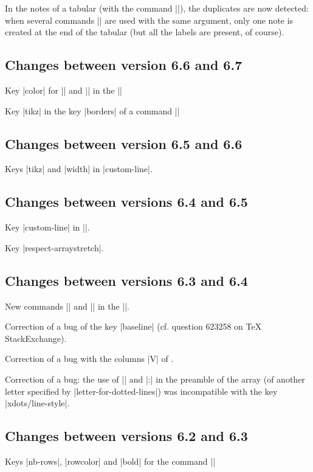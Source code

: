 \documentclass[dvipsnames]{article}%
\begin{document}
In the notes of a tabular (with the command |\tabularnote|), the duplicates
are now detected: when several commands |\tabularnote| are used with the same
argument, only one note is created at the end of the tabular (but all the
labels are present, of course).

\subsection*{Changes between version 6.6 and 6.7}

Key |color| for |\OverBrace| and |\UnderBrace| in the |\CodeAfter|

Key |tikz| in the key |borders| of a command |\Block|

\subsection*{Changes between version 6.5 and 6.6}

Keys |tikz| and |width| in |custom-line|.

\subsection*{Changes between versions 6.4 and 6.5}

Key |custom-line| in |\NiceMatrixOptions|.

Key |respect-arraystretch|.

\subsection*{Changes between versions 6.3 and 6.4}

New commands |\UnderBrace| and |\OverBrace| in the |\CodeAfter|.

Correction of a bug of the key |baseline| (cf. question 623258 on TeX StackExchange).

Correction of a bug with the columns |V| of .

Correction of a bug: the use of |\hdottedline| and |:| in the preamble of the
array (of another letter specified by |letter-for-dotted-lines|) was
incompatible with the key |xdots/line-style|.

\subsection*{Changes between versions 6.2 and 6.3}

Keys |nb-rows|, |rowcolor| and |bold| for the command |\RowStyle|
\end{document}
